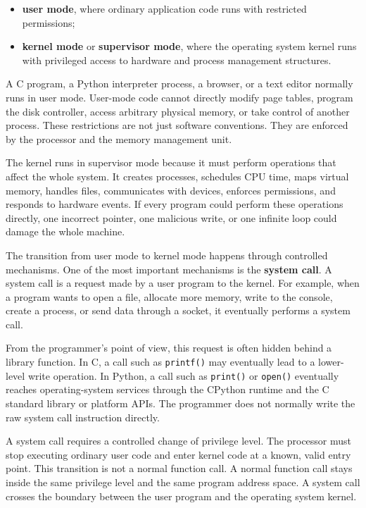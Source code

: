 \begin{itemize}
    \item \textbf{user mode}, where ordinary application code runs with restricted permissions;
    \item \textbf{kernel mode} or \textbf{supervisor mode}, where the operating system kernel runs with privileged access to hardware and process management structures.
\end{itemize}

A C program, a Python interpreter process, a browser, or a text editor normally runs in user mode. User-mode code cannot directly modify page tables, program the disk controller, access arbitrary physical memory, or take control of another process. These restrictions are not just software conventions. They are enforced by the processor and the memory management unit.

The kernel runs in supervisor mode because it must perform operations that affect the whole system. It creates processes, schedules CPU time, maps virtual memory, handles files, communicates with devices, enforces permissions, and responds to hardware events. If every program could perform these operations directly, one incorrect pointer, one malicious write, or one infinite loop could damage the whole machine.

The transition from user mode to kernel mode happens through controlled mechanisms. One of the most important mechanisms is the \textbf{system call}. A system call is a request made by a user program to the kernel. For example, when a program wants to open a file, allocate more memory, write to the console, create a process, or send data through a socket, it eventually performs a system call.

From the programmer's point of view, this request is often hidden behind a library function. In C, a call such as \texttt{printf()} may eventually lead to a lower-level write operation. In Python, a call such as \texttt{print()} or \texttt{open()} eventually reaches operating-system services through the CPython runtime and the C standard library or platform APIs. The programmer does not normally write the raw system call instruction directly.

A system call requires a controlled change of privilege level. The processor must stop executing ordinary user code and enter kernel code at a known, valid entry point. This transition is not a normal function call. A normal function call stays inside the same privilege level and the same program address space. A system call crosses the boundary between the user program and the operating system kernel.


